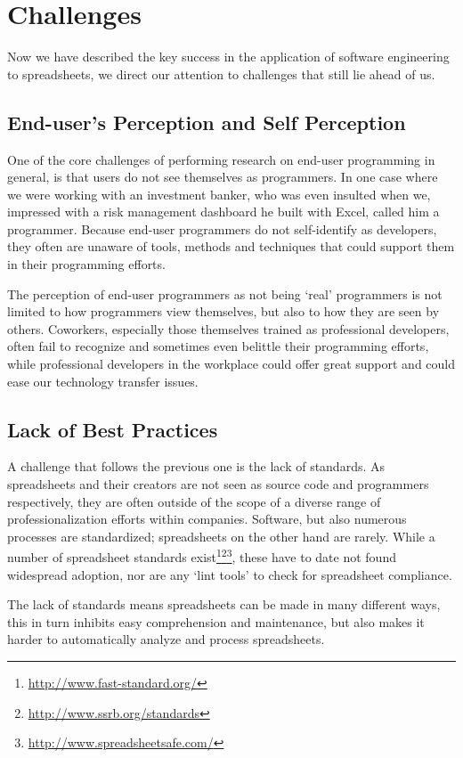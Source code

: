 \documentclass[conference]{IEEEtran}
\begin{document}
\section{Challenges} 
Now we have described the key success in the application of software engineering to spreadsheets, we direct our attention to challenges that still lie ahead of us. 

\subsection{End-user's Perception and Self Perception}
One of the core challenges of performing research on end-user programming in general, is that users do not see themselves as programmers. In one case where we were working with an investment banker, who was even insulted when we, impressed with a risk management dashboard he built with Excel, called him a programmer. Because end-user programmers do not self-identify as developers, they often are unaware of tools, methods and techniques that could support them in their programming efforts.

The perception of end-user programmers as not being `real' programmers is not limited to how programmers view themselves, but also to how they are seen by others. Coworkers, especially those themselves trained as professional developers, often fail to recognize and sometimes even belittle their programming efforts, while professional developers in the workplace could offer great support and could ease our technology transfer issues. 

\subsection{Lack of Best Practices}
A challenge that follows the previous one is the lack of standards. As spreadsheets and their creators are not seen as source code and programmers respectively, they are often outside of the scope of a diverse range of professionalization efforts within companies. Software, but also numerous processes are standardized; spreadsheets on the other hand are rarely. While a number of spreadsheet standards exist\footnote{\url{http://www.fast-standard.org/}}\footnote{\url{http://www.ssrb.org/standards}}\footnote{\url{http://www.spreadsheetsafe.com/}}, these have to date not found widespread adoption, nor are any `lint tools' to check for spreadsheet compliance. 

The lack of standards means spreadsheets can be made in many different ways, this in turn inhibits easy comprehension and maintenance, but also makes it harder to automatically analyze and process spreadsheets.
\end{document}
